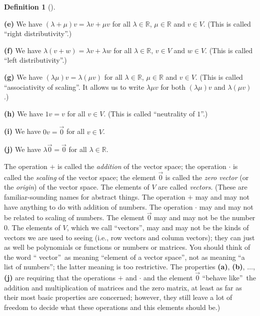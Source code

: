 \documentclass[numbers=enddot,12pt,final,onecolumn,notitlepage]{scrartcl}%
\theoremstyle{definition}
\newtheorem{defi}[theo]{Definition}
\newenvironment{definition}[1][]
{\begin{defi}[#1]\begin{leftbar}}
{\end{leftbar}\end{defi}}
\begin{document}
\begin{definition}
\textbf{(e)} We have $\left(  \lambda+\mu\right)  v=\lambda v+\mu v$ for all
$\lambda\in\mathbb{R}$, $\mu\in\mathbb{R}$ and $v\in V$. (This is called
\textquotedblleft right distributivity\textquotedblright.)

\textbf{(f)} We have $\lambda\left(  v+w\right)  =\lambda v+\lambda w$ for all
$\lambda\in\mathbb{R}$, $v\in V$ and $w\in V$. (This is called
\textquotedblleft left distributivity\textquotedblright.)

\textbf{(g)} We have $\left(  \lambda\mu\right)  v=\lambda\left(  \mu
v\right)  $ for all $\lambda\in\mathbb{R}$, $\mu\in\mathbb{R}$ and $v\in V$.
(This is called \textquotedblleft associativity of scaling\textquotedblright.
It allows us to write $\lambda\mu v$ for both $\left(  \lambda\mu\right)  v$
and $\lambda\left(  \mu v\right)  $.)

\textbf{(h)} We have $1v=v$ for all $v\in V$. (This is called
\textquotedblleft neutrality of $1$\textquotedblright.)

\textbf{(i)} We have $0v=\overrightarrow{0}$ for all $v\in V$.

\textbf{(j)} We have $\lambda\overrightarrow{0}=\overrightarrow{0}$ for all
$\lambda\in\mathbb{R}$.

The operation $+$ is called the \textit{addition} of the vector space; the
operation $\cdot$ is called the \textit{scaling} of the vector space; the
element $\overrightarrow{0}$ is called the \textit{zero vector} (or the
\textit{origin}) of the vector space. The elements of $V$ are called
\textit{vectors}. (These are familiar-sounding names for abstract things. The
operation $+$ may and may not have anything to do with addition of numbers.
The operation $\cdot$ may and may not be related to scaling of numbers. The
element $\overrightarrow{0}$ may and may not be the number $0$. The elements
of $V$, which we call \textquotedblleft vectors\textquotedblright, may and may
not be the kinds of vectors we are used to seeing (i.e., row vectors and
column vectors); they can just as well be polynomials or functions or numbers
or matrices. You should think of the word \textquotedblleft
vector\textquotedblright\ as meaning \textquotedblleft element of a vector
space\textquotedblright, not as meaning \textquotedblleft a list of
numbers\textquotedblright; the latter meaning is too restrictive. The
properties \textbf{(a)}, \textbf{(b)}, $\ldots$, \textbf{(j)} are requiring
that the operations $+$ and $\cdot$ and the element $\overrightarrow{0}$
\textquotedblleft behave like\textquotedblright\ the addition and
multiplication of matrices and the zero matrix, at least as far as their most
basic properties are concerned; however, they still leave a lot of freedom to
decide what these operations and this elements should be.)


\end{definition}
\end{document}
